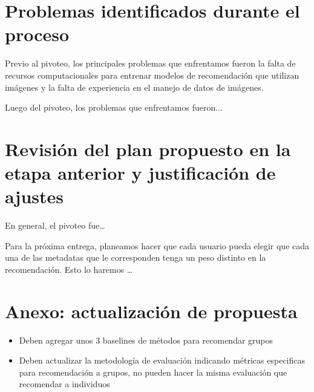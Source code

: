 \documentclass[11pt]{article}
\begin{document}

\section{Problemas identificados durante el proceso} 

Previo al pivoteo, los principales problemas que enfrentamos fueron la falta de recursos computacionales para entrenar modelos de recomendación que utilizan imágenes y la falta de experiencia en el manejo de datos de imágenes. %

Luego del pivoteo, los problemas que enfrentamos fueron... %

\section{Revisión del plan propuesto en la etapa anterior y justificación de ajustes} 

En general, el pivoteo fue\dots %

Para la próxima entrega, planeamos hacer que cada usuario pueda elegir que cada una de las metadatas que le corresponden tenga un peso distinto en la recomendación. Esto lo haremos \dots %

\section{Anexo: actualización de propuesta}
\begin{itemize}
    \item Deben agregar unos 3 baselines de métodos para recomendar grupos
    \item Deben actualizar la metodología de evaluación indicando métricas especificas para recomendación a grupos, no pueden hacer la misma evaluación que recomendar a individuos
\end{itemize}
\end{document}

